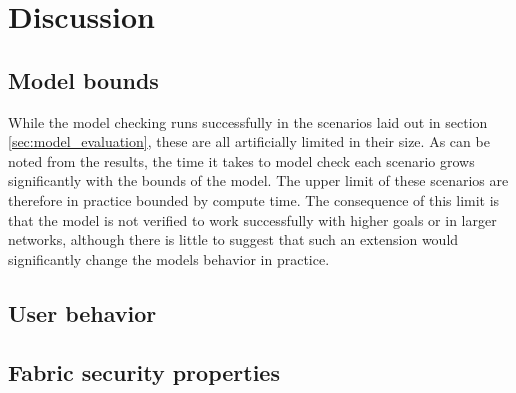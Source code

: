 \chapter{Discussion}
\label{ch:discussion}

\section{Model bounds}

While the model checking runs successfully in the scenarios laid out in section \ref{sec:model_evaluation}, these are all artificially limited in their size. As can be noted from the results, the time it takes to model check each scenario grows significantly with the bounds of the model. The upper limit of these scenarios are therefore in practice bounded by compute time. The consequence of this limit is that the model is not verified to work successfully with higher goals or in larger networks, although there is little to suggest that such an extension would significantly change the models behavior in practice.

\section{User behavior}



\section{Fabric security properties}

